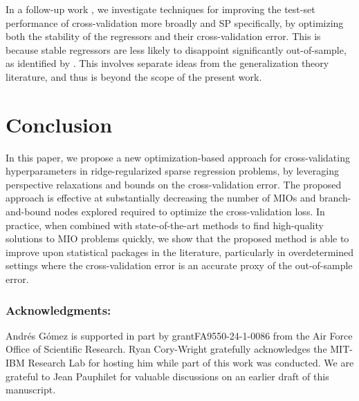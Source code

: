 \documentclass[ijoc,noblindrev]{informs3} %
\let\enotesize=\normalsize
\begin{document}
In a follow-up work \citep{cory2025stability}, we investigate techniques for improving the test-set performance of cross-validation more broadly and SP specifically, by optimizing both the stability of the regressors and their cross-validation error. This is because stable regressors are less likely to disappoint significantly out-of-sample, as identified by \cite{bousquet2002stability}. This involves separate ideas from the generalization theory literature, and thus is beyond the scope of the present work.

\section{Conclusion}
In this paper, we propose a new optimization-based approach 
for cross-validating hyperparameters in ridge-regularized sparse regression problems, by leveraging perspective relaxations and bounds on the cross-validation error. The proposed approach is effective at substantially decreasing the number of MIOs and branch-and-bound nodes explored required to optimize the cross-validation loss. In practice, when combined with state-of-the-art methods to find high-quality solutions to MIO problems quickly, we show that the proposed method is able to improve upon statistical packages in the literature, particularly in overdetermined settings where the cross-validation error is an accurate proxy of the out-of-sample error.  



 \subsubsection*{Acknowledgments: } Andr\'es G\'omez is supported in part by grantFA9550-24-1-0086 from the Air Force Office of Scientific Research. Ryan Cory-Wright gratefully acknowledges the MIT-IBM Research Lab for hosting him while part of this work was conducted. We are grateful to Jean Pauphilet for valuable discussions on an earlier draft of this manuscript.
{\def\enotesize{\footnotesize}

\theendnotes
}
\end{document}
